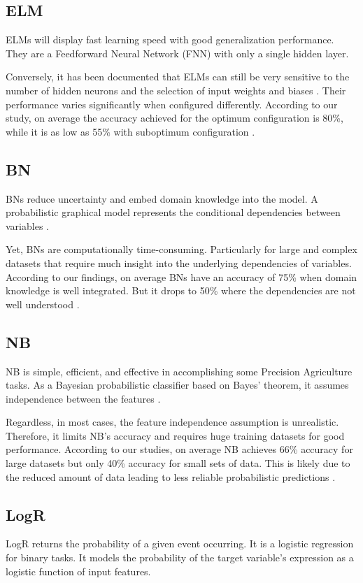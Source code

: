 \documentclass[conference]{IEEEtran}
\begin{document}
\subsection{ELM}\label{AA}
ELMs will display fast learning speed with good generalization performance. They are a Feedforward Neural Network (FNN) with only a single hidden layer.

Conversely, it has been documented that ELMs can still be very sensitive to the number of hidden neurons and the selection of input weights and biases \cite{b23}. Their performance varies significantly when configured differently. According to our study, on average the accuracy achieved for the optimum configuration is 80\%, while it is as low as 55\% with suboptimum configuration \cite{b24}.

\subsection{BN}\label{AA}
BNs reduce uncertainty and embed domain knowledge into the model. A probabilistic graphical model represents the conditional dependencies between variables \cite{b25}. 

Yet, BNs are computationally time-consuming. Particularly for large and complex datasets that require much insight into the underlying dependencies of variables. According to our findings, on average BNs have an accuracy of 75\% when domain knowledge is well integrated. But it drops to 50\% where the dependencies are not well understood \cite{b26}. 

\subsection{NB}\label{AA}
NB is simple, efficient, and effective in accomplishing some Precision Agriculture tasks. As a Bayesian probabilistic classifier based on Bayes' theorem, it assumes independence between the features \cite{b27}. 

Regardless, in most cases, the feature independence assumption is unrealistic. Therefore, it limits NB's accuracy and requires huge training datasets for good performance. According to our studies, on average NB achieves 66\% accuracy for large datasets but only 40\% accuracy for small sets of data. This is likely due to the reduced amount of data leading to less reliable probabilistic predictions \cite{b28}. 

\subsection{LogR}\label{AA}
LogR returns the probability of a given event occurring. It is a logistic regression for binary tasks. It models the probability of the target variable's expression as a logistic function of input features. 
\end{document}
